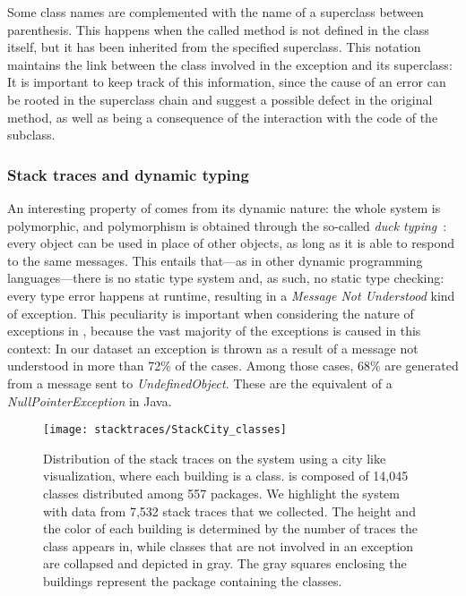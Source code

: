 Some class names are complemented with the name of a superclass between parenthesis.
This happens when the called method is not defined in the class itself, but it has been inherited from the specified superclass.
This notation maintains the link between the class involved in the exception and its superclass: It is important to keep track of this information, since the cause of an error can be rooted in the superclass chain and suggest a possible defect in the original method, as well as being a consequence of the interaction with the code of the subclass.

\subsubsection{Stack traces and dynamic typing}

An interesting property of \pha comes from its dynamic nature: the whole system is polymorphic, and polymorphism is obtained through the so-called \emph{duck typing}~\cite{Chugh2012}: every object can be used in place of other objects, as long as it is able to respond to the same messages.
This entails that---as in other dynamic programming languages---there is no static type system and, as such, no static type checking: every type error happens at runtime, resulting in a \emph{Message Not Understood} kind of exception.
This peculiarity is important when considering the nature of exceptions in \pha, because the vast majority of the exceptions is caused in this context: In our dataset an exception is thrown as a result of a message not understood in more than 72\% of the cases.
Among those cases, 68\% are generated from a message sent to \emph{UndefinedObject}.
These are the equivalent of a \emph{NullPointerException} in Java.

\begin{figure*}[ht]
\centering
  \texttt{[image: stacktraces/StackCity\_classes]}
  \caption[Distribution of the stack traces on the \pha system using a city like visualization]{Distribution of the stack traces on the \pha system using a city like visualization, where each building is a class.
\pha is composed of 14,045 classes distributed among 557 packages.
We highlight the system with data from 7,532 stack traces that we collected.
The height and the color of each building is determined by the number of traces the class appears in, while classes that are not involved in an exception are collapsed and depicted in gray.
The gray squares enclosing the buildings represent the package containing the classes.}
  \label{fig:stackcity-classes}
\end{figure*}

